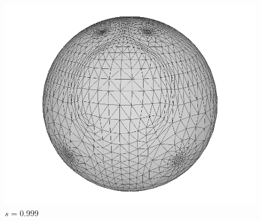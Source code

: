 \documentclass[11pt]{amsart}
\begin{document}
\begin{figure}[H]
\begin{center}
\begin{minipage}[!h]{0.27\textwidth}
\centering
\includegraphics[width=\textwidth]{spotCMCF25}
\caption*{$s = 0.999$} \label{fig:spotcmcf5}
\end{minipage}
\end{center}
\end{figure}
\end{document}
